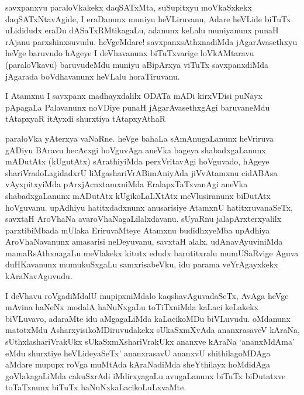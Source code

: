 \begin{artha}
savxpanxvu paraloVkakekx daqSATxMta, suSupitxyu moVkaSxkekx daqSATxNtavAgide, I eraDanunx muniyu heVLiruvanu, Adare heVLide biTuTx uLididudx eraDu dASaTxRMtikagaLu, adanunx keLalu muniyanunx punaH rAjanu parxshinxsuvudu. heVgeMdare! savxpanxsAthxnadiMda jAgarAvasethxyu heVge baruvudo hAgeye I deVhavanunx biTuTxvarige loVkAMtaravu (paraloVkavu) baruvudeMdu muniyu aBipArxya viTuTx savxpanxdiMda jAgarada boVdhavanunx heVLalu horaTiruvanu. 
\end{artha}%

\begin{artha}
I Atamxnu I savxpanx madhayxdalilx ODATa mADi kirxVDisi puNayx pApagaLa Palavanunx noVDiye punaH jAgarAvasethxgAgi baruvaneMdu tAtapxyaR \stext itAyxdi shurxtiya tAtapxyAthaR
\end{artha}

\begin{artha}
paraloVka yAterxya vaNaRne. heVge bahaLa sAmAnugaLanunx heVriruva gADiyu BAravu hecAcxgi hoVguvAga aneVka bageya shabadxgaLanunx mADutAtx (kUgutAtx) sArathiyiMda perxVritavAgi hoVguvado, hAgeye shariVradoLagidadxrU liMgashariVrABimAniyAda jiVvAtamxnu cidABAsa vAyxpitxyiMda pArxjAcnxtamxniMda EralapxTaTxvanAgi aneVka shabadxgaLanunx mADutAtx kUgikoLaLXtAtx meVlusiranunx biDutAtx hoVguvanu. upAdhiyu hatitxdadxnunx anusarisiye AtamxnU hatitxruvanaSeTx, savxtaH AroVhaNa avaroVhaNagaLilalxdavanu. sUyaRnu jalapArxterxyalilx parxtibiMbada mUlaka EriruvaMteye Atamxnu budidhxyeMba upAdhiya AroVhaNavanunx amasarisi neDeyuvanu, savxtaH alalx. udAnavAyuviniMda mamaRsAthxnagaLu meVlakekx kitutx edudx barutitxralu mumUSaRvige Aguva duHKavanunx mumukuSxgaLu samxrisabeVku, idu parama veYrAgayxkekx kAraNavAguvudu.  
\end{artha}


\begin{artha}
I deVhavu roVgadiMdalU mupipxniMdalo kaqshavAguvadaSeTx, AvAga heVge mAvina haNeNx modalA haNuNxgaLu toTiTxniMda kaLaci keLakekx biVLuvavo, adaraMte idu aMgagaLiMda kaLacikoMDu biVLuvudu. oMdanunx matotxMdu AsharxyisikoMDiruvudakekx sUkaSxmXvAda ananxrasaveV kAraNa, sUthxlashariVrakUkx sUkaSxmXshariVrakUkx ananxve kAraNa `ananxMdAma' eMdu shurxtiye heVLideyaSeTx' ananxrasavU ananxvU shithilagoMDAga aMdare mupupx roVga muMtAda kAraNadiMda sheYthilayx hoMdidAga goVlakagaLiMda cakuSxrAdi iMdirxyagaLu avugaLanunx biTuTx biDutatxve toTaTxnunx biTuTx haNuNxkaLacikoLuLxvaMte. 
\end{artha}%

